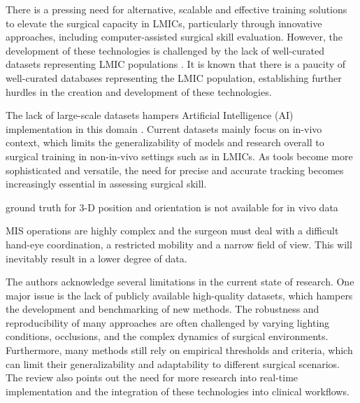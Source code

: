 There is a pressing need for alternative, scalable and effective training solutions to elevate the surgical capacity in LMICs, particularly through innovative approaches, including computer-assisted surgical skill evaluation. However, the development of these technologies is challenged by the lack of well-curated datasets representing LMIC populations \cite{maier-hein_surgical_2022}. It is known that there is a paucity of well-curated databases \cite{organization_health_2016} representing the LMIC population, establishing further hurdles in the creation and development of these technologies. 

The lack of large-scale datasets hampers Artificial Intelligence (AI) implementation in this domain \cite{nwoye_cholectrack20_2023}. Current datasets mainly focus on in-vivo context, which limits the generalizability of models and research overall to surgical training in non-in-vivo settings such as in LMICs. As tools become more sophisticated and versatile, the need for precise and accurate tracking becomes increasingly essential in assessing surgical skill.

ground truth for 3-D position and orientation is not available for in vivo data 

MIS operations are highly complex and the surgeon must deal with a difficult hand-eye coordination, a restricted mobility and a narrow field of view. This will inevitably result in a lower degree of data.

The authors acknowledge several limitations in the current state of research. One major issue is the lack of publicly available high-quality datasets, which hampers the development and benchmarking of new methods. The robustness and reproducibility of many approaches are often challenged by varying lighting conditions, occlusions, and the complex dynamics of surgical environments. Furthermore, many methods still rely on empirical thresholds and criteria, which can limit their generalizability and adaptability to different surgical scenarios. The review also points out the need for more research into real-time implementation and the integration of these technologies into clinical workflows. 



